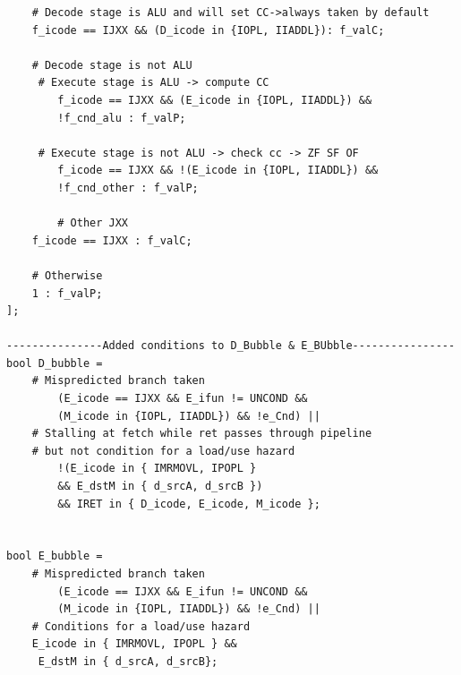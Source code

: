 \documentclass{article}
\begin{document}
\begin{lstlisting}
	# Decode stage is ALU and will set CC->always taken by default
	f_icode == IJXX && (D_icode in {IOPL, IIADDL}): f_valC;

	# Decode stage is not ALU
	 # Execute stage is ALU -> compute CC
        f_icode == IJXX && (E_icode in {IOPL, IIADDL}) && 
        !f_cnd_alu : f_valP;

	 # Execute stage is not ALU -> check cc -> ZF SF OF
        f_icode == IJXX && !(E_icode in {IOPL, IIADDL}) && 
        !f_cnd_other : f_valP;
        
        # Other JXX
	f_icode == IJXX : f_valC;

	# Otherwise
	1 : f_valP;
];

---------------Added conditions to D_Bubble & E_BUbble----------------
bool D_bubble =
	# Mispredicted branch taken
        (E_icode == IJXX && E_ifun != UNCOND && 
        (M_icode in {IOPL, IIADDL}) && !e_Cnd) ||
	# Stalling at fetch while ret passes through pipeline
	# but not condition for a load/use hazard
        !(E_icode in { IMRMOVL, IPOPL } 
        && E_dstM in { d_srcA, d_srcB }) 
        && IRET in { D_icode, E_icode, M_icode };


bool E_bubble =
	# Mispredicted branch taken
        (E_icode == IJXX && E_ifun != UNCOND && 
        (M_icode in {IOPL, IIADDL}) && !e_Cnd) ||
	# Conditions for a load/use hazard
	E_icode in { IMRMOVL, IPOPL } &&
	 E_dstM in { d_srcA, d_srcB};
\end{lstlisting}
\end{document}
